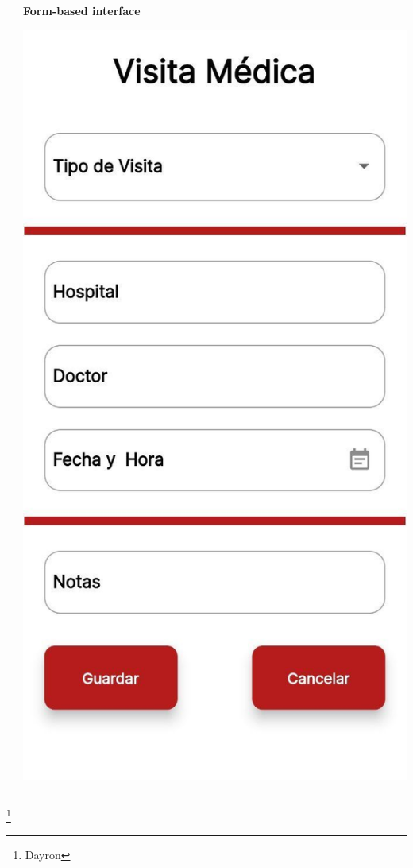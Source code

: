 \documentclass[14pt]{beamer}
\begin{document}
\begin{frame}
\begin{columns}
\begin{column}{0.5\textwidth}
\begin{center}
\end{center}
\end{column}
\begin{column}{0.5\textwidth}
\textbf{Form-based interface}
\begin{center}

\includegraphics[scale = 0.12]{Images/form.jpg}

\end{center}
\end{column}
\end{columns}
\footnote{Dayron}
\end{frame}
\end{document}
